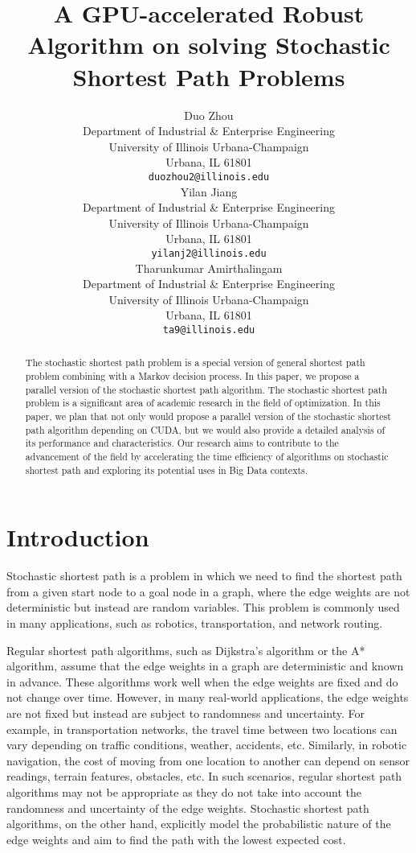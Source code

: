 \documentclass{article}
\title{A GPU-accelerated Robust Algorithm on solving Stochastic Shortest Path Problems}
\author{
  Duo Zhou\\
  Department of Industrial \& Enterprise Engineering\\
  University of Illinois Urbana-Champaign\\
  Urbana, IL 61801 \\
  \texttt{duozhou2@illinois.edu} \\
  \And
  Yilan Jiang \\
  Department of Industrial \& Enterprise Engineering\\
  University of Illinois Urbana-Champaign\\
  Urbana, IL 61801 \\
  \texttt{yilanj2@illinois.edu} \\
  \And
  Tharunkumar Amirthalingam\\
  Department of Industrial \& Enterprise Engineering\\
  University of Illinois Urbana-Champaign\\
  Urbana, IL 61801 \\
  \texttt{ta9@illinois.edu} \\
}
\begin{document}
\maketitle

\begin{abstract}
  The stochastic shortest path problem is a special version of general shortest path problem combining with 
  a Markov decision process. In this paper, we propose a parallel version of the stochastic shortest path algorithm. 
  The stochastic shortest path problem is a significant area of academic research in the field of optimization. 
  In this paper, we plan that not only would propose a parallel version of the stochastic shortest path algorithm 
  depending on CUDA, but we would also provide a detailed analysis of its performance and characteristics. 
  Our research aims to contribute to the advancement of the field by accelerating the time efficiency of algorithms 
  on stochastic shortest path and exploring its potential uses in Big Data contexts. 
\end{abstract}

\section{Introduction}

Stochastic shortest path is a problem in which we need to find the shortest path from
a given start node to a goal node in a graph, where the edge weights are not deterministic 
but instead are random variables. This problem is commonly used in many applications, 
such as robotics, transportation, and network routing.

Regular shortest path algorithms, such as Dijkstra's algorithm or the A* algorithm, 
assume that the edge weights in a graph are deterministic and known in advance. 
These algorithms work well when the edge weights are fixed and do not change over time. 
However, in many real-world applications, the edge weights are not fixed but instead are 
subject to randomness and uncertainty. For example, in transportation networks, the travel 
time between two locations can vary depending on traffic conditions, weather, accidents, etc. 
Similarly, in robotic navigation, the cost of moving from one location to another can depend 
on sensor readings, terrain features, obstacles, etc. In such scenarios, regular shortest path 
algorithms may not be appropriate as they do not take into account the randomness and uncertainty 
of the edge weights. Stochastic shortest path algorithms, on the other hand, explicitly model the 
probabilistic nature of the edge weights and aim to find the path with the lowest expected cost.
\end{document}
